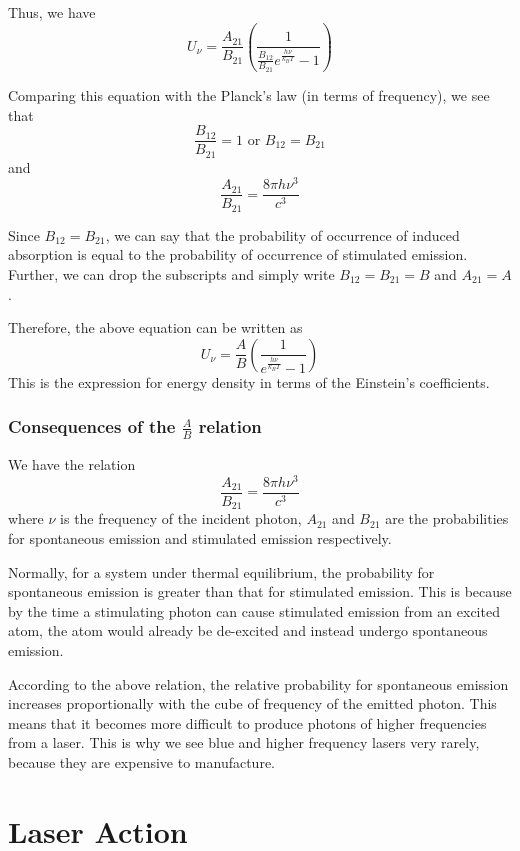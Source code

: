 \documentclass[12pt]{article}
\begin{document}
Thus, we have
\[U_\nu = \frac{A_{21}}{B_{21}} \left(\frac{1}{\frac{B_{12}}{B_{21}}e^{\frac{h\nu}{k_BT}}-1}\right)\]

Comparing this equation with the Planck's law (in terms of frequency), we see that
\[\frac{B_{12}}{B_{21}}=1 \text{ or } B_{12} = B_{21}\]
and
\[\frac{A_{21}}{B_{21}}=\frac{8\pi h\nu^3}{c^3}\]

Since \(B_{12} = B_{21}\), we can say that the probability of occurrence of induced absorption is equal to the probability of occurrence of stimulated emission. Further, we can drop the subscripts and simply write \(B_{12} = B_{21} = B\) and \(A_{21}=A\).

Therefore, the above equation can be written as
\[U_\nu = \frac{A}{B} \left(\frac{1}{e^{\frac{h\nu}{k_BT}}-1}\right)\]
This is the expression for energy density in terms of the Einstein's coefficients.

\subsubsection*{Consequences of the \(\frac{A}{B}\) relation}
We have the relation
\[\frac{A_{21}}{B_{21}}=\frac{8\pi h\nu^3}{c^3}\]
where \(\nu\) is the frequency of the incident photon, \(A_{21}\) and \(B_{21}\) are the probabilities for spontaneous emission and stimulated emission respectively.

Normally, for a system under thermal equilibrium, the probability for spontaneous emission is greater than that for stimulated emission. This is because by the time a stimulating photon can cause stimulated emission from an excited atom, the atom would already be de-excited and instead undergo spontaneous emission.

According to the above relation, the relative probability for spontaneous emission increases proportionally with the cube of frequency of the emitted photon. This means that it becomes more difficult to produce photons of higher frequencies from a laser. This is why we see blue and higher frequency lasers very rarely, because they are expensive to manufacture.

\section{Laser Action}
\end{document}
